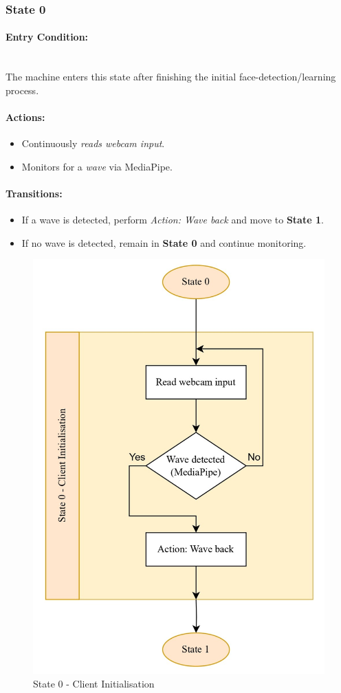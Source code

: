 \documentclass[conference]{IEEEtran}
\begin{document}
\subsubsection{State 0}
\paragraph{Entry Condition:}
\mbox{}\\
The machine enters this state after finishing the initial face-detection/learning process.

\paragraph{Actions:}
\begin{itemize}
  \item Continuously \emph{reads webcam input}.
  \item Monitors for a \emph{wave} via MediaPipe.
\end{itemize}

\paragraph{Transitions:}
\begin{itemize}
  \item If a wave is detected, perform \emph{Action: Wave back} and move to \textbf{State 1}.
  \item If no wave is detected, remain in \textbf{State 0} and continue monitoring.
\end{itemize}

\begin{figure}
    \centering
    \includegraphics[width=.6\linewidth]{State 0 - Client Initialisation.jpg}
    \caption{State 0 - Client Initialisation}
    \label{State 0 - Client Initialisation}
\end{figure}
\end{document}
